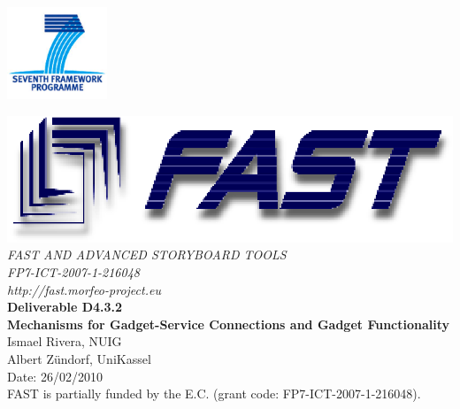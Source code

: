 \documentclass{fast_latex}
\newcommand{\note}[1]{\begin{scriptsize}{{\textsf{\textbf{{\textcolor{Red}{[[#1]]}}}}}}\end{scriptsize}}
\newcommand{\note}[1]{\textbf{}}
\newcommand\deliverableNumber{D4.3.2}
\newcommand\deliverableTitle{Mechanisms for Gadget-Service Connections and Gadget Functionality}
\newcommand\authorOne{Ismael Rivera, NUIG}
\newcommand\authorTwo{Albert Z\"undorf, UniKassel}
\begin{document}

\def\note#1{\marginpar{\footnotesize#1}} %



\thispagestyle{empty}


\begin{flushright}
	\includegraphics[width=3cm]{images/FP7_logo}
\end{flushright}

\vspace{1cm}

	\begin{center}
		\includegraphics{images/FAST_logo}\\
		\vspace{1cm}
		{\LARGE{\sffamily \emph{FAST AND ADVANCED STORYBOARD TOOLS}}}\\
		\vspace{0.5cm}
		{\LARGE \sffamily \emph{FP7-ICT-2007-1-216048}}\\
		\vspace{0.5cm}
		{\LARGE \sffamily \emph{http://fast.morfeo-project.eu}}\\
		\vspace{4cm}
		{\LARGE \sffamily \textbf{Deliverable \deliverableNumber}}\\
		\vspace{0.5cm}
		{\LARGE \sffamily \textbf{\deliverableTitle}}\\
		\vspace{2cm}
		{\large \sffamily \authorOne}\\
		{\large \sffamily \authorTwo}\\
		\vspace{0.5cm}
		\vfill
		{\large \sffamily Date: 26/02/2010}\\
		\vspace{1cm}
		{\sffamily FAST is partially funded by the E.C. (grant code: FP7-ICT-2007-1-216048).}
		
	\end{center}
\end{document}

